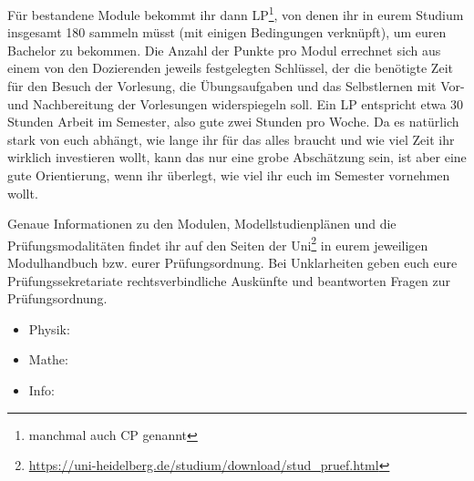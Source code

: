 Für bestandene Module bekommt ihr dann \gls{LP}\footnote{manchmal auch \gls{CP} genannt}, von denen ihr in eurem Studium insgesamt 180 sammeln müsst (mit einigen Bedingungen verknüpft), um euren Bachelor zu bekommen. Die Anzahl der Punkte pro Modul errechnet sich aus einem von den Dozierenden jeweils festgelegten Schlüssel, der die benötigte Zeit für den Besuch der Vorlesung, die Übungsaufgaben und das Selbstlernen mit Vor- und Nachbereitung der Vorlesungen widerspiegeln soll. Ein \gls{LP} entspricht etwa 30 Stunden Arbeit im Semester, also gute zwei Stunden pro Woche. Da es natürlich stark von euch abhängt, wie lange ihr für das alles braucht und wie viel Zeit ihr wirklich investieren wollt, kann das nur eine grobe Abschätzung sein, ist aber eine gute Orientierung, wenn ihr überlegt, wie viel ihr euch im Semester vornehmen wollt.

Genaue Informationen zu den Modulen, Modellstudienplänen und die Prüfungsmodalitäten findet ihr auf den Seiten der Uni\footnote{\url{https://uni-heidelberg.de/studium/download/stud_pruef.html}} in eurem jeweiligen Modulhandbuch bzw. eurer Prüfungsordnung. Bei Unklarheiten geben euch eure Prüfungssekretariate rechtsverbindliche Auskünfte und beantworten Fragen zur Prüfungsordnung. 
\begin{itemize}
	\item Physik: \pruefsekphysik
	\item Mathe: \pruefsekmathe
	\item Info: \pruefsekinfo
\end{itemize}
